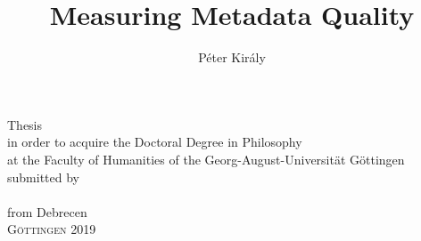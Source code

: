 \documentclass[
  paper=6.69in:9.61in, fontsize=10pt, BCOR=9mm, DIV=15,
  pagesize=pdftex,
  headings=openright,
  headsepline,
  chapterprefix,
  appendixprefix,
  draft=false,
  listof=totoc,
  listof=leveldown
]{scrbook}
\title{Measuring Metadata Quality}
\author{Péter Király}
\begin{document}

\frontmatter

\makeatletter

\begin{titlepage}
  \begin{center}

  {\sffamily{\bfseries{\Huge\strut\@title}}}
  \vspace{48pt}
  \par
  \par
  Thesis\\
in order to acquire the Doctoral Degree in Philosophy\\
at the Faculty of Humanities of the Georg-August-Universität Göttingen\\
  \vspace{24pt}
  submitted by\\
  {\scshape{\@author}}\\
  from Debrecen\\
  \vspace{12pt}
  {\scshape{Göttingen 2019}}
  \end{center}
\end{titlepage}

\makeatother
%


\begin{otherlanguage}{ngerman}

\end{otherlanguage}



\mainmatter









\appendix





% 




\end{document}
